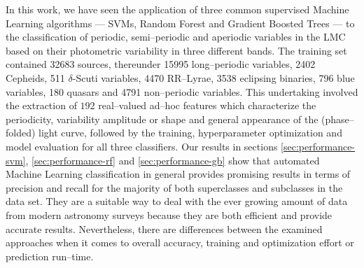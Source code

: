 
In this work, we have seen the application of three common supervised Machine Learning algorithms --- SVMs, Random Forest and Gradient Boosted Trees --- to the classification of periodic, semi--periodic and aperiodic variables in the LMC based on their photometric variability in three different bands. The training set contained 32683 sources, thereunder 15995 long--periodic variables, 2402 Cepheids, 511 $\delta$-Scuti variables, 4470 RR--Lyrae, 3538 eclipsing binaries, 796 blue variables, 180 quasars and 4791 non--periodic variables. This undertaking involved the extraction of $192$ real--valued ad--hoc features which characterize the periodicity, variability amplitude or shape and general appearance of the (phase--folded) light curve, followed by the training, hyperparameter optimization and model evaluation for all three classifiers. Our results in sections \ref{sec:performance-svm}, \ref{sec:performance-rf} and \ref{sec:performance-gb} show that automated Machine Learning classification in general provides promising results in terms of precision and recall for the majority of both superclasses and subclasses in the data set. They are a suitable way to deal with the ever growing amount of data from modern astronomy surveys because they are both efficient and provide accurate results. Nevertheless, there are differences between the examined approaches when it comes to overall accuracy, training and optimization effort or prediction run--time.\\

